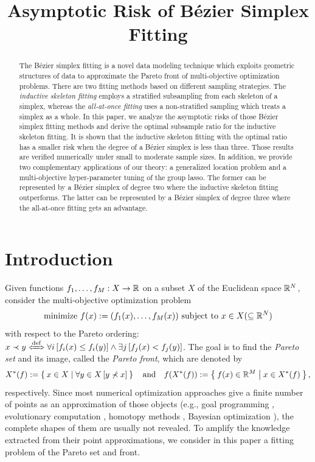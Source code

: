 \documentclass{article}
\title{Asymptotic Risk of B\'ezier Simplex Fitting}
\begin{document}
\maketitle

\begin{abstract}
The B\'ezier simplex fitting is a novel data modeling technique which exploits geometric structures of data to approximate the Pareto front of multi-objective optimization problems.
There are two fitting methods based on different sampling strategies.
The \emph{inductive skeleton fitting} employs a stratified subsampling from each skeleton of a simplex, whereas the \emph{all-at-once fitting} uses a non-stratified sampling which treats a simplex as a whole.
In this paper, we analyze the asymptotic risks of those B\'ezier simplex fitting methods and derive the optimal subsample ratio for the inductive skeleton fitting.
It is shown that the inductive skeleton fitting with the optimal ratio has a smaller risk when the degree of a B\'ezier simplex is less than three.
Those results are verified numerically under small to moderate sample sizes.
In addition, we provide two complementary applications of our theory: a generalized location problem and a multi-objective hyper-parameter tuning of the group lasso.
The former can be represented by a B\'ezier simplex of degree two where the inductive skeleton fitting outperforms.
The latter can be represented by a B\'ezier simplex of degree three where the all-at-once fitting gets an advantage.
\end{abstract}

\section{Introduction}
Given functions $f_1,\dots,f_M: X \to \mathbb{R}$ on a subset $X$ of the Euclidean space $\mathbb{R}^N$, consider the multi-objective optimization problem
\[
\text{minimize } f(x) := (f_1(x), \dots, f_M(x)) \text{ subject to } x \in X (\subseteq \mathbb{R}^N)
\]
with respect to the Pareto ordering: $x \prec y \xLeftrightarrow{\mathrm{def}} \forall i \sqbra{f_i(x) \leq f_i(y)} \land \exists j \sqbra{f_j(x) < f_j(y)}$.
The goal is to find the \emph{Pareto set} and its image, called the \emph{Pareto front}, which are denoted by
\[
X^*(f) := \Set{x \in X | \forall y \in X \left[y \not\prec x \right]}
\quad \text{and} \quad
f(X^*(f)) := \Set{f(x) \in \mathbb{R}^M | x \in X^*(f)},
\]
respectively.
Since most numerical optimization approaches give a finite number of points as an approximation of those objects (e.g., goal programming \cite{Miettinen1999,Eichfelder2008}, evolutionary computation \cite{Deb2001,Zhang2007,Deb2014}, homotopy methods \cite{Hillermeier2001,Harada2007}, Bayesian optimization \cite{Hernandez-Lobato2016,Yang2019}), the complete shapes of them are usually not revealed.
To amplify the knowledge extracted from their point approximations, we consider in this paper a fitting problem of the Pareto set and front.
\end{document}
